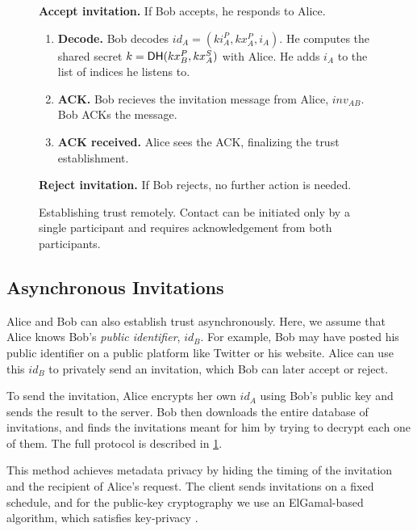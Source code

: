 \begin{figure}[th!]
\begin{framed}
{\begin{hangparas}{1em}{1}
    \medskip

      \textbf{Accept invitation.}
          If Bob accepts, he responds to Alice.
          \begin{enumerate}
              \item \textbf{Decode.} Bob decodes $id_A = (ki_A^P, kx_A^P, i_A)$. He computes the shared secret $k =  \mathsf{DH}(kx_B^P, kx^S_A)$ with Alice. He adds $i_A$ to the list of indices he listens to.
              \item \textbf{ACK.} Bob recieves the invitation message from Alice, $inv_{AB}$. Bob ACKs the message.
              \item \textbf{ACK received.} Alice sees the ACK, finalizing the trust establishment.
          \end{enumerate}
    \medskip
          
      \textbf{Reject invitation.}
        If Bob rejects, no further action is needed.
  \end{hangparas}
  }
  \end{framed}
  \caption{Establishing trust remotely. Contact can be initiated only by a single participant and requires acknowledgement from both participants.}
  \label{fig:trust-establishment-async}
\end{figure}


\subsection{Asynchronous Invitations}

Alice and Bob can also establish trust asynchronously. Here, we assume that Alice knows Bob's \textit{public identifier}, $id_B$. For example, Bob may have posted his public identifier on a public platform like Twitter or his website. Alice can use this $id_B$ to privately send an invitation, which Bob can later accept or reject. 

To send the invitation, Alice encrypts her own $id_A$ using Bob's public key and sends the result to the server. Bob then downloads the entire database of invitations, and finds the invitations meant for him by trying to decrypt each one of them. The full protocol is described in \cref{fig:trust-establishment-async}.

This method achieves metadata privacy by hiding the timing of the invitation and the recipient of Alice's request. The client sends invitations on a fixed schedule, and for the public-key cryptography we use an ElGamal-based algorithm, which satisfies key-privacy \cite{bellare2001key}.
    
